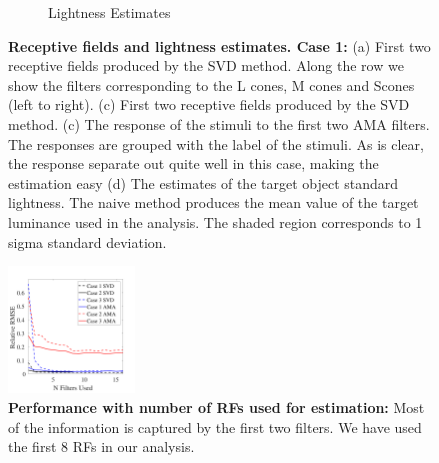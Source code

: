 \documentclass{jov}
\begin{document}
\begin{figure}
\begin{subfigure}[b]{0.20 \textwidth}
        \caption{Lightness Estimates}
        \label{fig:case9Results}
    \end{subfigure}    
    \caption{{\bf Receptive fields and lightness estimates. Case 1:} (a) First two receptive fields produced by the SVD method. Along the row we show the filters corresponding to the L cones, M cones and Scones (left to right). (c) First two receptive fields produced by the SVD method. (c) The response of the stimuli to the first two AMA filters. The responses are grouped with the label of the stimuli. As is clear, the response separate out quite well in this case, making the estimation easy (d) The estimates of the target object standard lightness. The naive method produces the mean value of the target luminance used in the analysis. The shaded region corresponds to 1 sigma standard deviation.}
\label{fig:case9AllResults}
\end{figure}

\begin{figure}
\centering
\includegraphics[width=0.3\textwidth]{Figure5/RMSEvsNFilters16.pdf}
\caption{{\bf Performance with number of RFs used for estimation:} Most of the information is captured by the first two filters. We have used the first 8 RFs in our analysis.}
\label{fig:RMSEvsNFilters}
\end{figure}
\end{document}

